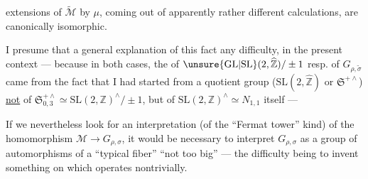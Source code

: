 

extensions of $\widetilde{\mathcal M}$ by $\mu$, coming out of apparently rather different calculations, are canonically isomorphic.

I presume that a general explanation of this fact  any difficulty, in the present context --- because in both cases, the  of $\unsure{\mathrm{GL}|\mathrm{SL}}(2,\widehat{\mathbb Z})/\pm1$ resp. of $G_{\rho,\widetilde\sigma}$ came from the fact that I had started from a quotient group ($\mathrm{SL}(2,\widehat{\mathbb Z})$ or $\mathfrak S^{+\wedge}$) \uline{not} of $\mathfrak S_{0,3}^{+\wedge}\simeq\mathrm{SL}(2,\mathbb Z)^\wedge/\pm1$, but of $\mathrm{SL}(2,\mathbb Z)^\wedge\simeq N_{1,1}$ itself ---

If we nevertheless look for an interpretation (of the ``Fermat tower'' kind) of the homomorphism $\mathcal M\to G_{\rho,\sigma}$, it would be necessary to interpret $G_{\rho,\sigma}$  as a group of automorphisms of a ``typical fiber'' ``not too big'' --- the difficulty being to invent something on which  operates nontrivially.



